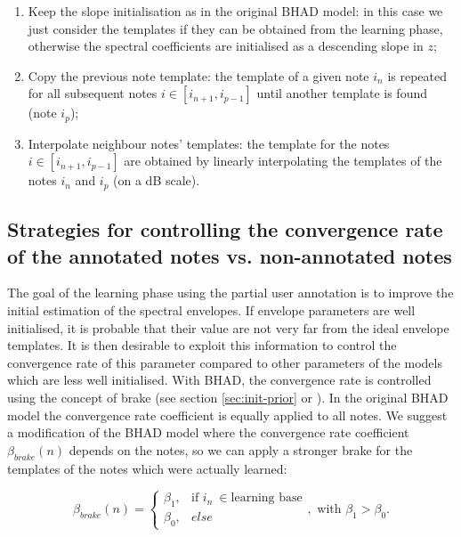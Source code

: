 \documentclass{article}
\begin{document}
\begin{enumerate}
\item Keep the slope initialisation as in the original BHAD model: in this case we just consider the templates if they can be obtained from the learning phase, otherwise the spectral coefficients are initialised as a descending slope in $z$;
\item Copy the previous note template: the template of a given note $i_n$ is repeated for all subsequent notes $i \in [i_{n+1}, i_{p-1}]$ until another template is found (note $i_p$);
\item Interpolate neighbour notes' templates: the template for the notes $i \in [i_{n+1}, i_{p-1}]$ are obtained by linearly interpolating the templates of the notes $i_n$ and $i_p$ (on a dB scale).
\end{enumerate}

\subsection{Strategies for controlling the convergence rate of the annotated notes vs. non-annotated notes}

The goal of the learning phase using the partial user annotation is to improve the initial estimation of the spectral envelopes. If envelope parameters are well initialised, it is probable that their value are not very far from the ideal envelope templates.  It is then desirable to exploit this information to control the convergence rate of this parameter compared to other parameters of the models which are less well initialised. With BHAD, the convergence rate is controlled using the concept of brake (see section \ref{sec:init-prior} or \cite{Fuentes2012_EUSIPCO}). In the original BHAD model the convergence rate coefficient is equally applied to all notes.  %
We suggest a modification of the BHAD model where the convergence rate coefficient $\beta_{brake}(n)$ depends on the notes, so we can apply a stronger brake for the templates of the notes which were actually learned:

\begin{equation}
\beta_{brake}(n) = \left\{
\begin{array}{ll}
\beta_1, & \textrm{if }i_n\ \in \textrm{learning base} \\
\beta_0, & else
\end{array}
\right. , \textrm{ with } \beta_1 > \beta_0.
\end{equation}
\end{document}
